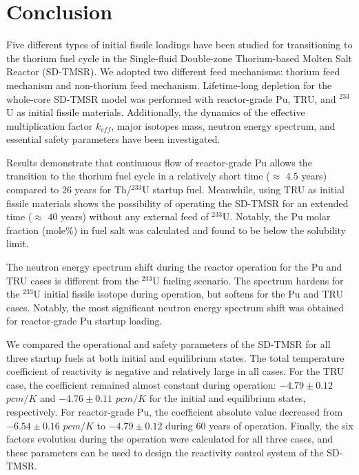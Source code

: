 \section{Conclusion} \label{Conclusion}
Five different types of initial fissile loadings have been studied for 
transitioning to the thorium fuel cycle in the Single-fluid Double-zone 
Thorium-based Molten Salt Reactor (SD-TMSR). We 
adopted two different feed mechanisms: thorium feed mechanism and non-thorium 
feed mechanism. Lifetime-long depletion for the whole-core SD-TMSR model was 
performed with reactor-grade Pu, TRU, and $^{233}$U as initial fissile 
materials. Additionally, the dynamics of the effective multiplication factor 
$k_{eff}$, major isotopes mass, neutron energy spectrum, and essential safety 
parameters have been investigated. 

Results demonstrate that continuous flow of reactor-grade Pu allows the 
transition to the thorium fuel cycle in a relatively short time ($\approx$ 
$4.5$ years) compared to $26$ years for Th/$^{233}$U startup fuel. 
Meanwhile, using \gls{TRU} as initial fissile materials shows the possibility 
of operating the SD-TMSR for an extended time ($\approx$ $40$ years) 
without any external feed of $^{233}$U. Notably, the Pu molar fraction (mole\%) in 
fuel salt was calculated and found to be below the solubility limit. 

The neutron energy spectrum shift during the reactor operation 
for the Pu and TRU cases is different from the $^{233}$U fueling scenario. 
The spectrum hardens for the $^{233}$U initial fissile isotope during 
operation, but softens for the Pu and TRU cases. Notably, the most 
significant neutron energy spectrum shift was obtained for reactor-grade Pu 
startup loading. 

We compared the operational and safety parameters of the \gls{SD-TMSR} for all 
three startup fuels at both initial and equilibrium states. The total 
temperature coefficient of reactivity is negative and relatively large in all 
cases. For the TRU case, the coefficient remained almost constant during 
operation: $-4.79\pm0.12$ $pcm/K$ and $-4.76\pm0.11$ $pcm/K$ for the initial 
and equilibrium states, respectively. For reactor-grade Pu, the coefficient 
absolute value decreased from $-6.54\pm0.16$ $pcm/K$ to $-4.79\pm0.12$ during 
60 years of operation. Finally, the six factors evolution during the operation 
were calculated for all three cases, and these parameters can be used to 
design the reactivity control system of the \gls{SD-TMSR}.

